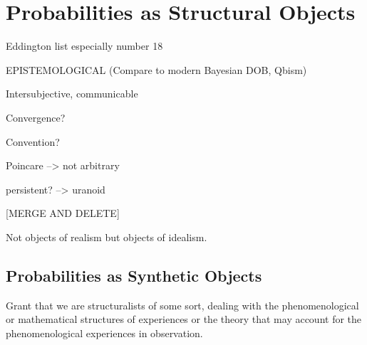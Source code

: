 






\section{Probabilities as Structural Objects}



Eddington list especially number 18

EPISTEMOLOGICAL (Compare to modern Bayesian DOB, Qbism)

Intersubjective, communicable

Convergence?

Convention?

Poincare --> not arbitrary

persistent?  --> uranoid

[MERGE AND DELETE]



Not objects of realism but objects of idealism.

\subsection{Probabilities as Synthetic Objects}

Grant that we are structuralists of some sort, dealing with the phenomenological or mathematical structures of experiences or the theory that may account for the phenomenological experiences in observation.  

